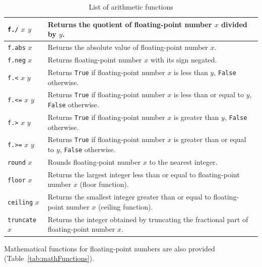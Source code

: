 \begin{table}[h]
\begin{center}
\begin{tabular}{ | l | p{9cm} |}
    \texttt{f./} $x$ $y$ & Returns the quotient of floating-point number $x$ divided by $y$. \\ \hline
    \texttt{f.abs} $x$ & Returns the absolute value of floating-point number $x$. \\ \hline
    \texttt{f.neg} $x$ & Returns floating-point number $x$ with its sign negated. \\ \hline
    \texttt{f.<} $x$ $y$ & Returns \texttt{True} if floating-point number $x$ is less than $y$, \texttt{False} otherwise. \\ \hline
    \texttt{f.<=} $x$ $y$ & Returns \texttt{True} if floating-point number $x$ is less than or equal to $y$, \texttt{False} otherwise. \\ \hline
    \texttt{f.>} $x$ $y$ & Returns \texttt{True} if floating-point number $x$ is greater than $y$, \texttt{False} otherwise. \\ \hline
    \texttt{f.>=} $x$ $y$ & Returns \texttt{True} if floating-point number $x$ is greater than or equal to $y$, \texttt{False} otherwise. \\ \hline
    \texttt{round} $x$ & Rounds floating-point number $x$ to the nearest integer. \\ \hline
    \texttt{floor} $x$ & Returns the largest integer less than or equal to floating-point number $x$ (floor function). \\ \hline
    \texttt{ceiling} $x$ & Returns the smallest integer greater than or equal to floating-point number $x$ (ceiling function). \\ \hline
    \texttt{truncate} $x$ & Returns the integer obtained by truncating the fractional part of floating-point number $x$. \\ \hline
    \end{tabular}
\end{center}
    \caption{List of arithmetic functions}
    \label{tab:arithFunctions}
\end{table}

Mathematical functions for floating-point numbers are also provided (Table~\ref{tab:mathFunctions}).


